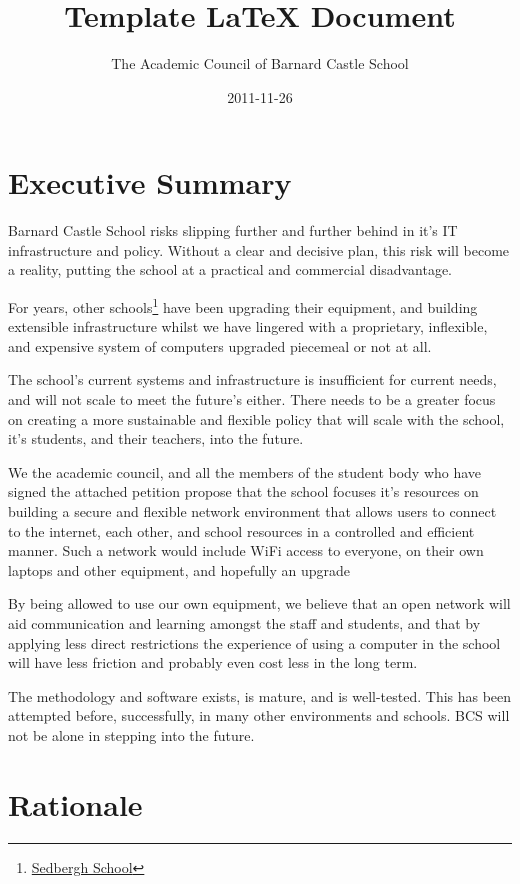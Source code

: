 \documentclass[a4paper,leqno,titlepage]{article}
\title{Template LaTeX Document}
\author{The Academic Council of Barnard Castle School}
\date{2011-11-26}
\begin{document}
\maketitle

\section{Executive Summary}

Barnard Castle School risks slipping further and further behind in it's
IT infrastructure and policy.
Without a clear and decisive plan, this risk will become a reality, putting
the school at a practical and commercial disadvantage.


For years, other schools\footnote{\href{http://www.sedberghschool.org/ict.html}{Sedbergh School}} 
have been upgrading their equipment, and building extensible infrastructure
whilst we have lingered with a proprietary, inflexible, and expensive system of
computers upgraded piecemeal or not at all.


The school's current systems and infrastructure is insufficient for current
needs, and will not scale to meet the future's either.
There needs to be a greater focus on creating a more sustainable and flexible
policy that will scale with the school, it's students, and their teachers, into
the future.


We the academic council, and all the members of the student body who have signed
the attached petition propose that the school focuses it's resources on building
a secure and flexible network environment that allows users to connect to the
internet, each other, and school resources in a controlled and efficient manner.
Such a network would include WiFi access to everyone, on their own laptops and
other equipment, and hopefully an upgrade 


By being allowed to use our own equipment, we believe that an open network will
aid communication and learning amongst the staff and students, and that by
applying less direct restrictions the experience of using a computer in the
school will have less friction and probably even cost less in the long term.


The methodology and software exists, is mature, and is well-tested. This has been
attempted before, successfully, in many other environments and schools. BCS will
not be alone in stepping into the future.



\section{Rationale}
\end{document}

